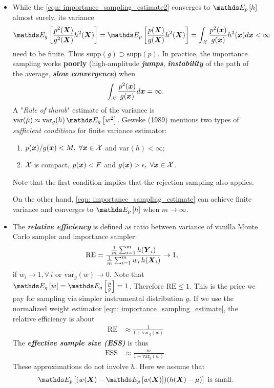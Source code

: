 \documentclass[11pt]{article}
\begin{document}
\begin{itemize}
\item While the \eqref{eqn: importance_sampling_estimate2} converges to $\E{p}{h}$ almost surely, its variance 
\begin{align}
\E{g}{\frac{p^2(\mb{X})}{g^2(\mb{X})}h^2(\mb{X})} = \E{p}{\frac{p(\mb{X})}{g(\mb{X})}h^2(\mb{X})} = \int_{\cX} \frac{p^2(\mb{x})}{g(\mb{x})}h^2(\mb{x}) d\mb{x} < \infty \label{eqn: importance_sampling_variance}
\end{align} need to be finite. Thus $\text{supp}(g) \supset \text{supp}(p)$. In practice, the importance sampling works \textbf{poorly} (high-amplitude \textbf{\emph{jumps}}, \emph{\textbf{instability}} of the path of the average, \emph{\textbf{slow convergence}}) when 
\begin{align*}
\int_{{\mathcal X}}\frac{p^2(\boldsymbol{x})}{g(\boldsymbol{x})} d\boldsymbol{x} = \infty.
\end{align*} A "\emph{Rule of thumb}" estimate of the variance is $\text{var}(\hat{\mu}) \approx \text{var}_{g}(h)\,\E{g}{w^2}$. Geweke (1989) mentions two types of \emph{sufficient conditions} for finite variance estimator:
\begin{enumerate}
\item $p(\boldsymbol{x})/g(\boldsymbol{x}) < M,\; \forall \boldsymbol{x}\in {\mathcal X}$ and $\text{var}(h) < \infty$;
\item ${\mathcal X}$ is compact, $p(\boldsymbol{x}) < F$ and $g(\boldsymbol{x}) > \epsilon, \;\forall \boldsymbol{x} \in {\mathcal X}$.
\end{enumerate} Note that the first condition implies that the rejection sampling also applies.

On the other hand, \eqref{eqn: importance_sampling_estimate} can achieve finite variance and converges to $\E{p}{h}$ when $m\rightarrow \infty$. 

\item The \emph{\textbf{relative efficiency}} is defined as ratio between variance of vanilla Monte Carlo sampler and importance sampler: 
\begin{align*}
\text{RE} &= \frac{\frac{1}{m}\sum_{i=1}^{m}h(\boldsymbol{Y}_i)}{\frac{1}{m}\sum_{i=1}^{m}w_i\,h(\boldsymbol{X}_i)} \rightarrow 1,
\end{align*} if $w_i \rightarrow 1, \forall\,i$ or $\text{var}_{g}(w)\rightarrow 0$. Note that $\E{g}{w} = \E{g}{\frac{p}{g}} = 1$. Therefore $\text{RE} \le 1$. This is the price we pay for sampling via simpler instrumental distribution $g$.
If we use the normalized weight estimator \eqref{eqn: importance_sampling_estimate}, the relative efficiency is about
\begin{align}
\text{RE} &\approx \frac{1}{1 + \text{var}_{g}(w)} \label{eqn: importance_sampling_rel_eff}
\end{align} The \emph{\textbf{effective sample size (ESS)}} is thus 
\begin{align*}
\text{ESS} & \approx \frac{m}{1 + \text{var}_{g}(w)}.
\end{align*} These approximations do not involve $h$. Here we assume that 
\begin{align*}
\E{p}{(w(\mb{X}) - \E{p}{w(\mb{X})})(h(\mb{X}) - \mu)} \text{ is small}.
\end{align*}


\end{itemize}
\end{document}
